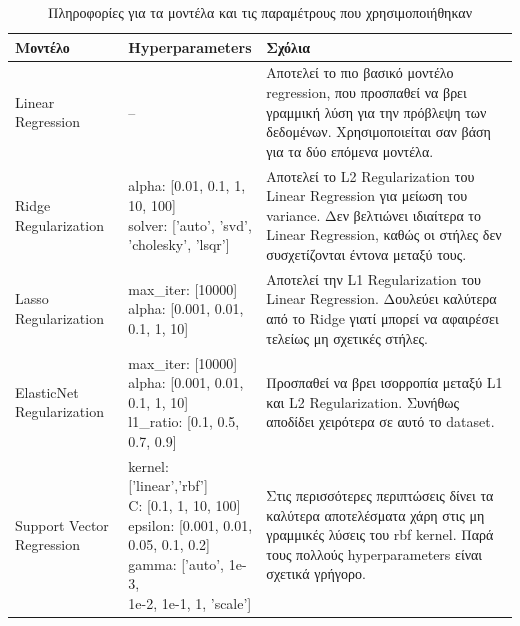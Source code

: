 \begin{table}[h!]
\centering
\caption{Πληροφορίες για τα μοντέλα και τις παραμέτρους που χρησιμοποιήθηκαν}
\label{tab:models_data}

\begin{tabularx}{\textwidth}{|
>{\raggedright\arraybackslash}p{3cm} |
>{\raggedright\arraybackslash\small}p{4cm} |
X |
}
\hline
\textbf{Μοντέλο} & 
\textbf{Hyperparameters} & 
\textbf{Σχόλια} \\
\hline

Linear Regression 
& -- 
& Αποτελεί το πιο βασικό μοντέλο regression, που προσπαθεί να βρει γραμμική λύση για την πρόβλεψη των δεδομένων. Χρησιμοποιείται σαν βάση για τα δύο επόμενα μοντέλα. \\
\hline

Ridge Regularization
&
\makecell[l]{
alpha: [0.01, 0.1, 1,\\ 10, 100] \\
solver: ['auto', 'svd',\\ 'cholesky', 'lsqr']
}
&
Αποτελεί το L2 Regularization του Linear Regression για μείωση του variance. Δεν βελτιώνει ιδιαίτερα το Linear Regression, καθώς οι στήλες δεν συσχετίζονται έντονα μεταξύ τους. \\
\hline

Lasso Regularization
&
\makecell[l]{
max\_iter: [10000] \\
alpha: [0.001, 0.01,\\ 0.1, 1, 10]
}
&
Αποτελεί την L1 Regularization του Linear Regression. Δουλεύει καλύτερα από το Ridge γιατί μπορεί να αφαιρέσει τελείως μη σχετικές στήλες. \\
\hline

ElasticNet Regularization
&
\makecell[l]{
max\_iter: [10000] \\
alpha: [0.001, 0.01,\\ 0.1, 1, 10] \\
l1\_ratio: [0.1, 0.5,\\ 0.7, 0.9]
}
&
Προσπαθεί να βρει ισορροπία μεταξύ L1 και L2 Regularization. Συνήθως αποδίδει χειρότερα σε αυτό το dataset. \\
\hline

Support Vector Regression
&
\makecell[l]{
kernel: ['linear','rbf'] \\
C: [0.1, 1, 10, 100] \\
epsilon: [0.001, 0.01,\\ 0.05, 0.1, 0.2] \\
gamma: ['auto', 1e-3,\\ 1e-2, 1e-1, 1, 'scale']
}
&
Στις περισσότερες περιπτώσεις δίνει τα καλύτερα αποτελέσματα χάρη στις μη γραμμικές λύσεις του rbf kernel. Παρά τους πολλούς hyperparameters είναι σχετικά γρήγορο. \\
\hline


\end{tabularx}
\end{table}

